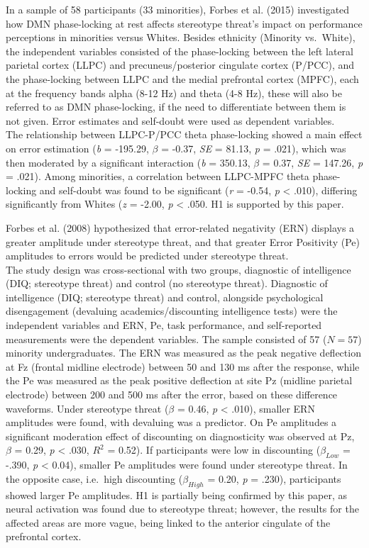\documentclass[
  stu, a4paper,floatsintext]{apa7}
\begin{document}
In a sample of 58 participants (33 minorities), Forbes et al. (2015) investigated how DMN phase-locking at rest affects stereotype threat's impact on performance perceptions in minorities versus Whites.
Besides ethnicity (Minority vs.~White), the independent variables consisted of the phase-locking between the left lateral parietal cortex (LLPC) and precuneus/posterior cingulate cortex (P/PCC), and the phase-locking between LLPC and the medial prefrontal cortex (MPFC), each at the frequency bands alpha (8-12 Hz) and theta (4-8 Hz), these will also be referred to as DMN phase-locking, if the need to differentiate between them is not given.
Error estimates and self-doubt were used as dependent variables.\\
The relationship between LLPC-P/PCC theta phase-locking showed a main effect on error estimation (\emph{b} = -195.29, \(\beta\) = -0.37, \emph{SE} = 81.13, \emph{p} = .021), which was then moderated by a significant interaction (\emph{b} = 350.13, \(\beta\) = 0.37, \emph{SE} = 147.26, \emph{p} = .021).
Among minorities, a correlation between LLPC-MPFC theta phase-locking and self-doubt was found to be significant (\emph{r} = -0.54, \emph{p} \textless{} .010), differing significantly from Whites (\emph{z} = -2.00, \emph{p} \textless{} .050.
H1 is supported by this paper.

Forbes et al. (2008) hypothesized that error-related negativity (ERN) displays a greater amplitude under stereotype threat, and that greater Error Positivity (Pe) amplitudes to errors would be predicted under stereotype threat.\\
The study design was cross-sectional with two groups, diagnostic of intelligence (DIQ; stereotype threat) and control (no stereotype threat).
Diagnostic of intelligence (DIQ; stereotype threat) and control, alongside psychological disengagement (devaluing academics/discounting intelligence tests) were the independent variables and ERN, Pe, task performance, and self-reported measurements were the dependent variables.
The sample consisted of 57 (\(N = 57\)) minority undergraduates.
The ERN was measured as the peak negative deflection at Fz (frontal midline electrode) between 50 and 130 ms after the response, while the Pe was measured as the peak positive deflection at site Pz (midline parietal electrode) between 200 and 500 ms after the error, based on these difference waveforms.
Under stereotype threat (\(\beta\) = 0.46, \emph{p} \textless{} .010), smaller ERN amplitudes were found, with devaluing was a predictor.
On Pe amplitudes a significant moderation effect of discounting on diagnosticity was observed at Pz, \(\beta\) = 0.29, \emph{p} \textless{} .030, \(R^2\) = 0.52).
If participants were low in discounting (\(\beta_{Low}\) = -.390, \emph{p} \textless{} 0.04), smaller Pe amplitudes were found under stereotype threat.
In the opposite case, i.e.~high discounting (\(\beta_{High}\) = 0.20, \emph{p} = .230), participants showed larger Pe amplitudes.
H1 is partially being confirmed by this paper, as neural activation was found due to stereotype threat; however, the results for the affected areas are more vague, being linked to the anterior cingulate of the prefrontal cortex.
\end{document}
